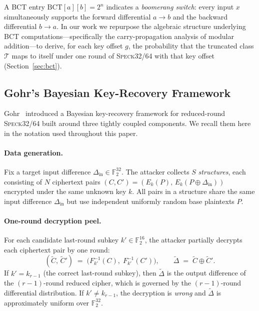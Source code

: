 \documentclass[runningheads]{llncs}
\newcommand{\BCT}{\mathrm{BCT}}
\newcommand{\speck}{\textsc{Speck}32/64}
\newcommand{\xor}{\oplus}
\begin{document}
A BCT entry $\BCT[a][b] = 2^n$ indicates a \emph{boomerang switch}: every
input $x$ simultaneously supports the forward differential $a \to b$
and the backward differential $b \to a$.  In our work we repurpose the
algebraic structure underlying BCT computations—specifically the
carry-propagation analysis of modular addition—to derive, for each
key offset $g$, the probability that the truncated class $\mathcal{T}$
maps to itself under one round of \speck{} with that key offset
(Section~\ref{sec:bct}).

\subsection{Gohr's Bayesian Key-Recovery Framework}
\label{subsec:gohr}

Gohr~\cite{Goh19} introduced a Bayesian key-recovery framework for
reduced-round \speck{} built around three tightly coupled components.
We recall them here in the notation used throughout this paper.

\paragraph{Data generation.}
Fix a target input difference
$\Delta_{\mathrm{in}} \in \mathbb{F}_2^{32}$.
The attacker collects $S$ \emph{structures}, each consisting of $N$
ciphertext pairs $(C, C') = (E_k(P),\, E_k(P \xor \Delta_{\mathrm{in}}))$
encrypted under the same unknown key $k$.
All pairs in a structure share the same input difference
$\Delta_{\mathrm{in}}$ but use independent uniformly random base
plaintexts $P$.

\paragraph{One-round decryption peel.}
For each candidate last-round subkey $k' \in \mathbb{F}_2^{16}$,
the attacker partially decrypts each ciphertext pair by one round:
\begin{equation}
  \label{eq:peel}
  (\tilde{C},\, \tilde{C}') \;=\;
  \bigl(F_{k'}^{-1}(C),\; F_{k'}^{-1}(C')\bigr),
  \qquad
  \widetilde{\Delta} \;=\; \tilde{C} \xor \tilde{C}'.
\end{equation}
If $k' = k_{r-1}$ (the correct last-round subkey), then
$\widetilde{\Delta}$ is the output difference of the $(r-1)$-round
reduced cipher, which is governed by the $(r-1)$-round differential
distribution.  If $k' \ne k_{r-1}$, the decryption is \emph{wrong} and
$\widetilde{\Delta}$ is approximately uniform over $\mathbb{F}_2^{32}$.
\end{document}
